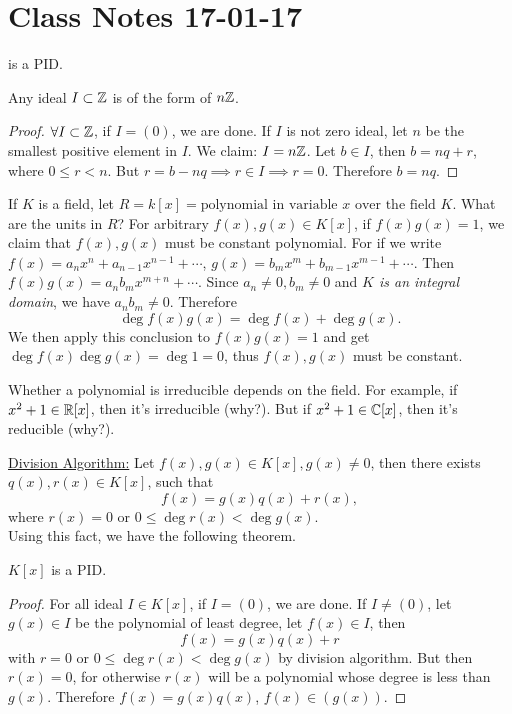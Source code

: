 \documentclass{mynotes}
\begin{document}
\section{Class Notes 17-01-17}
\begin{example}
\Z{} is a PID.
\end{example}
\begin{remark}
Any ideal $I\subset\mathbb{Z}$ is of the form of $n\mathbb{Z}$.
\end{remark}
\begin{proof}
$\forall I\subset \mathbb{Z}$, if $I=(0)$, we are done. If $I$ is not zero ideal, let $n$ be the smallest positive element in $I$. We claim: $I=n\mathbb{Z}$. Let $b\in I$, then $b=nq+r$, where $0\leq r<n$. But $r=b-nq\implies r\in I\implies r=0$. Therefore $b= nq$. 
\end{proof}
If $K$ is a field, let $R = k[x] = \mbox{polynomial in variable $x$ over the field $K$}$. What are the units in $R$? For arbitrary $f(x),g(x)\in K[x]$, if $f(x)g(x)=1$, we claim that $f(x), g(x)$ must be constant polynomial. For if we write $f(x)=a_nx^n+a_{n-1}x^{n-1}+\cdots$, $g(x)=b_mx^m+b_{m-1}x^{m-1}+\cdots$. Then $f(x)g(x) = a_nb_m x^{m+n}+\cdots$. Since $a_n\ne0,b_m\ne0$ and \emph{$K$ is an integral domain}, we have $a_nb_m\ne0$. Therefore $$\deg{f(x)g(x)} = \deg{f(x)}+\deg{g(x)}.$$ We then apply this conclusion to $f(x)g(x) = 1$ and get $\deg{f(x)}\deg{g(x)} = \deg{1} = 0$, thus $f(x), g(x)$ must be constant.
\begin{remark}
Whether a polynomial is irreducible depends on the field. For example, if $x^2+1\in \mathbb{R}[x]$, then it's irreducible (why?). But if $x^2+1\in \mathbb{C}[x]$, then it's reducible (why?).
\end{remark}
\underline{Division Algorithm:} Let $f(x), g(x)\in K[x], g(x)\ne 0$, then there exists $q(x),r(x)\in K[x]$, such that $$f(x)=g(x)q(x)+r(x),$$where $r(x)=0$ or $0\leq\deg{r(x)}<\deg{g(x)}$. \\
Using this fact, we have the following theorem.
\begin{theorem}\label{kxpid}
$K[x]$ is a PID.
\end{theorem}
\begin{proof}
For all ideal $I\in K[x]$, if $I=(0)$, we are done. If $I\ne(0)$, let $g(x)\in I$ be the polynomial of least degree, let $f(x)\in I$, then $$f(x)=g(x)q(x)+r$$with $r=0$ or $0\leq\deg{r(x)}<\deg{g(x)}$ by division algorithm. But then $r(x)=0$, for otherwise $r(x)$ will be a polynomial whose degree is less than $g(x)$. Therefore $f(x)=g(x)q(x)$, $f(x)\in (g(x))$.
\end{proof}
\end{document}
